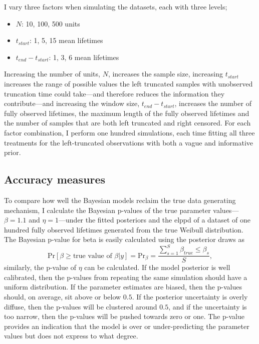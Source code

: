 I vary three factors when simulating the datasets, each with three levels;
\begin{itemize}
    \item $N$: 10, 100, 500 units
    \item $t_{start}$: 1, 5, 15 mean lifetimes
    \item $t_{end} - t_{start}$: 1, 3, 6 mean lifetimes
\end{itemize}
Increasing the number of units, $N$, increases the sample size, increasing $t_{start}$ increases the range of possible values the left truncated samples with unobserved truncation time could take---and therefore reduces the information they contribute---and increasing the window size, $t_{end} - t_{start}$, increases the number of fully observed lifetimes, the maximum length of the fully observed lifetimes and the number of samples that are both left truncated and right censored. For each factor combination, I perform one hundred simulations, each time fitting all three treatments for the left-truncated observations with both a vague and informative prior.

\subsection{Accuracy measures}

To compare how well the Bayesian models reclaim the true data generating mechanism, I calculate the Bayesian p-values of the true parameter values---$\beta = 1.1$ and $\eta = 1$---under the fitted posteriors and the elppd of a dataset of one hundred fully observed lifetimes generated from the true Weibull distribution. The Bayesian p-value for beta is easily calculated using the posterior draws as
\begin{equation*}
    \text{Pr}\left[\beta \ge \text{true value of }\beta|y\right] = \text{Pr}_{\beta} = \frac{\sum^{S}_{s = 1}{\beta_{true} \le \beta_s}}{S},
\end{equation*}
similarly, the p-value of $\eta$ can be calculated. If the model posterior is well calibrated, then the p-values from repeating the same simulation should have a uniform distribution. If the parameter estimates are biased, then the p-values should, on average, sit above or below $0.5$. If the posterior uncertainty is overly diffuse, then the p-values will be clustered around $0.5$, and if the uncertainty is too narrow, then the p-values will be pushed towards zero or one. The p-value provides an indication that the model is over or under-predicting the parameter values but does not express to what degree.

